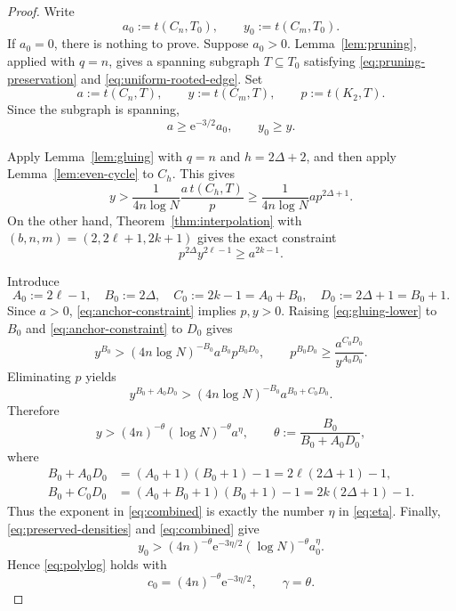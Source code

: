 \documentclass[11pt]{article}
\theoremstyle{definition}
\theoremstyle{remark}
\newcommand{\e}{\mathrm{e}}
\begin{document}
\begin{proof}
  Write
  \[
    a_0:=t(C_n,T_0),
    \qquad
    y_0:=t(C_m,T_0).
  \]
  If $a_0=0$, there is nothing to prove.  Suppose $a_0>0$.
  Lemma~\ref{lem:pruning}, applied with $q=n$, gives a spanning
  subgraph $T\subseteq T_0$ satisfying
  \eqref{eq:pruning-preservation} and
  \eqref{eq:uniform-rooted-edge}.  Set
  \[
    a:=t(C_n,T),
    \qquad
    y:=t(C_m,T),
    \qquad
    p:=t(K_2,T).
  \]
  Since the subgraph is spanning,
  \begin{equation}
    a\ge\e^{-3/2}a_0,
    \qquad
    y_0\ge y.
    \label{eq:preserved-densities}
  \end{equation}

  Apply Lemma~\ref{lem:gluing} with $q=n$ and
  $h=2\Delta+2$, and then apply Lemma~\ref{lem:even-cycle} to $C_h$.
  This gives
  \begin{equation}
    y>
    \frac1{4n\log N}\frac{a\,t(C_h,T)}p
    \ge
    \frac1{4n\log N}a p^{2\Delta+1}.
    \label{eq:gluing-lower}
  \end{equation}
  On the other hand, Theorem~\ref{thm:interpolation} with
  $(b,n,m)=(2,2\ell+1,2k+1)$ gives the exact constraint
  \begin{equation}
    p^{2\Delta}y^{2\ell-1}\ge a^{2k-1}.
    \label{eq:anchor-constraint}
  \end{equation}

  Introduce
  \[
    A_0:=2\ell-1,
    \quad
    B_0:=2\Delta,
    \quad
    C_0:=2k-1=A_0+B_0,
    \quad
    D_0:=2\Delta+1=B_0+1.
  \]
  Since $a>0$, \eqref{eq:anchor-constraint} implies $p,y>0$.
  Raising \eqref{eq:gluing-lower} to $B_0$ and
  \eqref{eq:anchor-constraint} to $D_0$ gives
  \[
    y^{B_0}>
    (4n\log N)^{-B_0}a^{B_0}p^{B_0D_0},
    \qquad
    p^{B_0D_0}
    \ge\frac{a^{C_0D_0}}{y^{A_0D_0}}.
  \]
  Eliminating $p$ yields
  \[
    y^{B_0+A_0D_0}>
    (4n\log N)^{-B_0}a^{B_0+C_0D_0}.
  \]
  Therefore
  \begin{equation}
    y>
    (4n)^{-\theta}(\log N)^{-\theta}a^\eta,
    \qquad
    \theta:=\frac{B_0}{B_0+A_0D_0},
    \label{eq:combined}
  \end{equation}
  where
  \[
  \begin{aligned}
    B_0+A_0D_0
    &=(A_0+1)(B_0+1)-1
      =2\ell(2\Delta+1)-1,\\
    B_0+C_0D_0
    &=(A_0+B_0+1)(B_0+1)-1
      =2k(2\Delta+1)-1.
  \end{aligned}
  \]
  Thus the exponent in \eqref{eq:combined} is exactly the number
  $\eta$ in \eqref{eq:eta}.  Finally,
  \eqref{eq:preserved-densities} and \eqref{eq:combined} give
  \[
    y_0>
    (4n)^{-\theta}\e^{-3\eta/2}
    (\log N)^{-\theta}a_0^\eta.
  \]
  Hence \eqref{eq:polylog} holds with
  \[
    c_0=(4n)^{-\theta}\e^{-3\eta/2},
    \qquad
    \gamma=\theta.
  \]
\end{proof}
\end{document}
